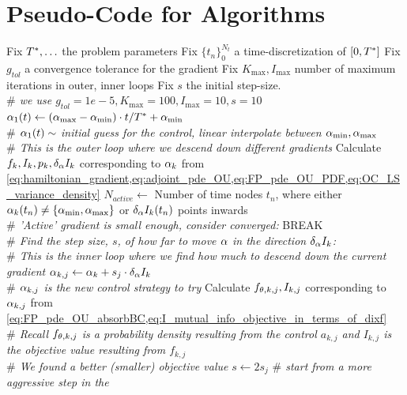 \section{Pseudo-Code for Algorithms}
\begin{algorithm}
\begin{algorithmic}
\State Fix ${ T^* }, \ldots$ the problem parameters
\State Fix $\{t_n\}_0^{N_t}$ a time-discretization of $[0,{ T^* }]$
\State Fix $g_{tol}$ a convergence tolerance for the gradient
\State Fix $K_{\max}, I_{\max}$ number of maximum iterations in outer, inner
loops
\State Fix $s$ the initial step-size. 
\\ {\itshape $\#$ we use $g_{tol}=1e-5,K_{\max}=100,I_{\max}=10,s=10$}
\State $\alpha_1(t) \gets ({ \alpha_{\textrm{max}} }-{ \alpha_{\textrm{min}} }) \cdot t / { T^* } + { \alpha_{\textrm{min}} }$ 
\\{\itshape  $\#$ $\alpha_1(t) \sim$ initial guess for the control, linear
interpolate between ${ \alpha_{\textrm{min}} }, { \alpha_{\textrm{max}} }$}
\\ {\itshape $\#$ This is the outer loop where we descend down different
gradients}
 \State Calculate $f_k,I_{k},p_k, \delta_\alpha I_k$ corresponding to
	$\alpha_k$ from
	\cref{eq:hamiltonian_gradient,eq:adjoint_pde_OU,eq:FP_pde_OU_PDF,eq:OC_LS_variance_density}
	\State $N_{active}\gets$   Number of time nodes $t_n$, where either
	$\alpha_k(t_n) \neq \{{ \alpha_{\textrm{min}} }, { \alpha_{\textrm{max}} }\}$ or $\delta_\alpha I_k(t_n)$ points inwards
		  \\ {\itshape  $\#$ 'Active' gradient is small enough,
		 consider converged:}
		 \State BREAK
	\EndIf
	\\ {\itshape $\#$ Find the step size, $s$, of how far to move $\alpha$ in the
	direction $\delta_\alpha I_k$:}
	\\ {\itshape $\#$ This is the inner loop where we find how much to descend down
	the current gradient}
	\State $\alpha_{k,j} \gets \alpha_{k} + s_j \cdot \delta_\alpha I_k  $
	\\ {\itshape $\#$ $\alpha_{k,j}$ is the new control strategy to try}
	\State Calculate $f_{{ \theta},k,j}, I_{k,j}$ corresponding to
		$\alpha_{k,j}$ from
		\cref{eq:FP_pde_OU_absorbBC,eq:I_mutual_info_objective_in_terms_of_dixf} \\
		{\itshape $\#$ Recall $f_{{ \theta},k,j}$ is a probability density resulting from
		the control $a_{k,j}$ and $I_{k,j}$ is the objective value resulting from $f_{k,j}$}  
		\\ {\itshape $\#$ We found a better (smaller) objective value}
		\State $s \gets 2 s_j$ {\itshape $\#$ start from a more aggressive step in the
}
\end{algorithmic}
\end{algorithm}
